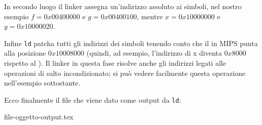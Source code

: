 \documentclass[class=book, crop=false, oneside]{standalone}
\begin{document}
In secondo luogo il linker assegna un'indirizzo assoluto ai simboli, nel nostro esempio \(f=0x00400000\) e \(g=0x00400100\), mentre \(x=0x10000000\) e \(y=0x10000020\).

Infine \texttt{ld} patcha tutti gli indirizzi dei simboli tenendo conto che il  in MIPS punta alla posizione \(0x10008000\) (quindi, ad esempio, l'indirizzo di x diventa \(0x8000\) rispetto al ). Il linker in questa fase risolve anche gli indirizzi legati alle operazioni di salto incondizionato; si può vedere facilmente questa operazione nell'esempio sottostante.

Ecco finalmente il file che viene dato come output da \texttt{ld}:
\begin{table}[H]
	{file-oggetto-output.tex}
	\caption{File di output}
\end{table}
\end{document}
